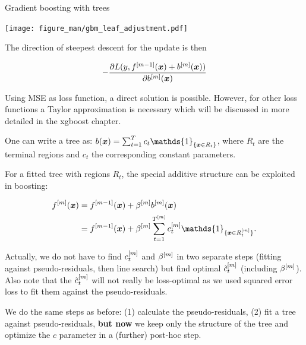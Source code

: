 \begin{vbframe}{Gradient boosting with trees}
\begin{center}

\texttt{[image: figure\_man/gbm\_leaf\_adjustment.pdf]}

\end{center}

\framebreak

The direction of steepest descent for the update is then

$$
-\frac{\partial L(y, f^{[m-1]}(\bm{x}) + b^{[m]}(\bm{x}))}{\partial b^{[m]}(\bm{x})}
$$

Using MSE as loss function, a direct solution is possible. However, for other loss functions a Taylor approximation is necessary which will be discussed in more detailed in the xgboost chapter.



\framebreak



\framebreak


One can write a tree as: $ b(\xv) = \sum_{t=1}^{T} c_t \mathds{1}_{\{\xv \in R_t\}} $,
where $R_t$ are the terminal regions and $c_t$ the corresponding constant parameters.

\vspace*{0.2cm}

For a fitted tree with regions $R_t$, the special additive structure can be exploited in boosting:  %

\begin{align*}
  \fm(\xv) &= \fmd(\xv) +  \betam \bmm(\xv) \\
         &= \fmd(\xv) +  \betam \sum_{t=1}^{\Tm} \ctm \mathds{1}_{\{\xv \in \Rtm\}}.
\end{align*}

Actually, we do not have to find $c_t^{[m]}$ and $\beta^{[m]}$ in two separate steps
(fitting against pseudo-residuals, then line search) but find optimal 
\textcolor{blue}{$\tilde{c}_t^{[m]}$} (including $\beta^{[m]}$).
Also note that the \textcolor{blue}{$\tilde{c}_t^{[m]}$} will not really be loss-optimal as 
we used squared error loss
to fit them against the pseudo-residuals.


\framebreak
\begin{footnotesize}
We do the same steps as before: (1) calculate the pseudo-residuals, (2) fit a tree against pseudo-residuals, \textbf{but now} we keep only the structure of the tree and optimize the $c$ parameter in a (further) post-hoc step.


\end{footnotesize}
\end{vbframe}
